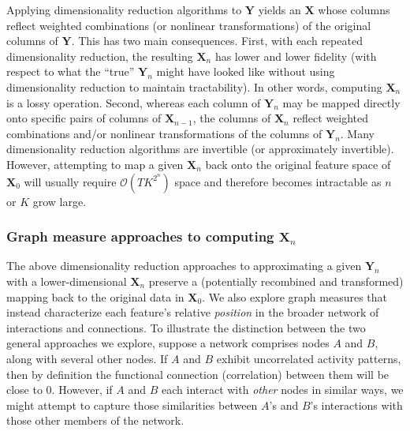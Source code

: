 \documentclass[english]{article}
\begin{document}
Applying dimensionality reduction algorithms to $\mathbf{Y}$ yields an
$\mathbf{X}$ whose columns reflect weighted combinations (or nonlinear
transformations) of the original columns of $\mathbf{Y}$.  This has
two main consequences.  First, with each repeated dimensionality
reduction, the resulting $\mathbf{X}_n$ has lower and lower fidelity
(with respect to what the ``true'' $\mathbf{Y}_n$ might have looked
like without using dimensionality reduction to maintain tractability).
In other words, computing $\mathbf{X}_n$ is a lossy operation.
Second, whereas each column of $\mathbf{Y}_n$ may be mapped
directly onto specific pairs of columns of $\mathbf{X}_{n-1}$, the
columns of $\mathbf{X}_n$ reflect weighted combinations and/or
nonlinear transformations of the columns of $\mathbf{Y}_n$.  Many
dimensionality reduction algorithms are invertible (or approximately
invertible).  However, attempting to map a given $\mathbf{X}_n$ back
onto the original feature space of $\mathbf{X}_0$ will usually require
$\mathcal{O}(TK^{2^n})$ space and therefore becomes intractable
as $n$ or $K$ grow large.

\subsubsection*{Graph measure approaches to computing
  $\mathbf{X}_n$}
The above dimensionality reduction approaches to approximating a given
$\mathbf{Y}_n$ with a lower-dimensional $\mathbf{X}_n$ preserve a
(potentially recombined and transformed) mapping back to the original
data in $\mathbf{X}_0$.  We also explore graph measures that instead
characterize each feature's relative \textit{position} in the broader
network of interactions and connections.  To illustrate the
distinction between the two general approaches we explore, suppose a
network comprises nodes $A$ and $B$, along with several other nodes.  If $A$ and $B$ exhibit
uncorrelated activity patterns, then by definition the functional connection
(correlation) between them will be close to 0.
However, if $A$ and $B$ each interact with \textit{other} nodes in similar ways, we
might attempt to capture those similarities between $A$'s and $B$'s
interactions with those other members of the network.
\end{document}
